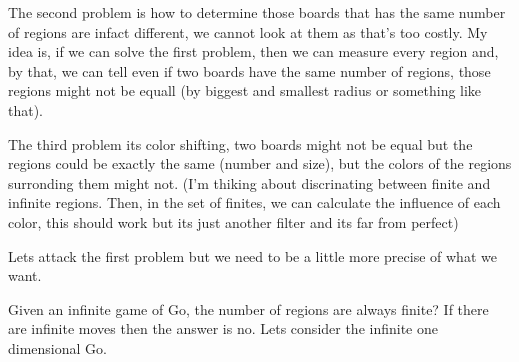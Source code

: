 The second problem is how to determine those boards that has the same number of regions are infact different, we cannot look at them as that's too costly. My idea is, if we can solve the first problem, then we can measure every region and, by that, we can tell even if two boards have the same number of regions, those regions might not be equall (by biggest and smallest radius or something like that). 

The third problem its color shifting, two boards might not be equal but the regions could be exactly the same (number and size), but the colors of the regions surronding them might not. (I'm thiking about discrinating between finite and infinite regions. Then, in the set of finites, we can calculate the influence of each color, this should work but its just another filter and its far from perfect)


Lets attack the first problem but we need to be a little more precise of what we want.

Given an infinite game of Go, the number of regions are always finite? If there are infinite moves then the answer is no. Lets consider the infinite one dimensional Go.

